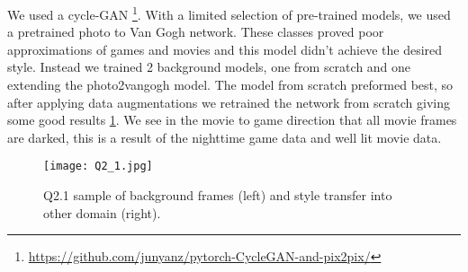 We used a cycle-GAN
\footnote{\url{https://github.com/junyanz/pytorch-CycleGAN-and-pix2pix/}}.
With a limited selection of pre-trained models, we used a pretrained photo to Van Gogh network.
These classes proved poor approximations of games and movies and this model didn't achieve the desired style.
Instead we trained 2 background models, one from scratch and one extending the photo2vangogh model.
The model from scratch preformed best, so after applying data augmentations we retrained the network from scratch giving some good results \ref{fig:Q2_1}.
We see in the movie to game direction that all movie frames are darked, this is a result of the nighttime game data and well lit movie data.

\begin{figure}[h!]
  \begin{center}
  \texttt{[image: Q2\_1.jpg]}
    \caption{Q2.1 sample of background frames (left) and style transfer into other domain (right).}
    \label{fig:Q2_1}
  \end{center}
  \end{figure}